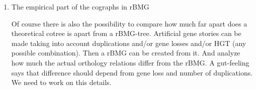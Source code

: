 \documentclass[11pt]{article}
\begin{document}
\begin{enumerate}
\item The empirical part of the cographs in rBMG 

Of course there is also the possibility to compare how much far apart does a theoretical cotree is apart from a rBMG-tree. Artificial gene stories can be made taking into account duplications and/or gene losses and/or HGT (any possible combination).  Then a rBMG can be created from it. And analyze how much the actual orthology relations differ from the rBMG. A gut-feeling says that difference should depend from gene loss and number of duplications. We need to work on this details.


\end{enumerate}


% 
\end{document}
